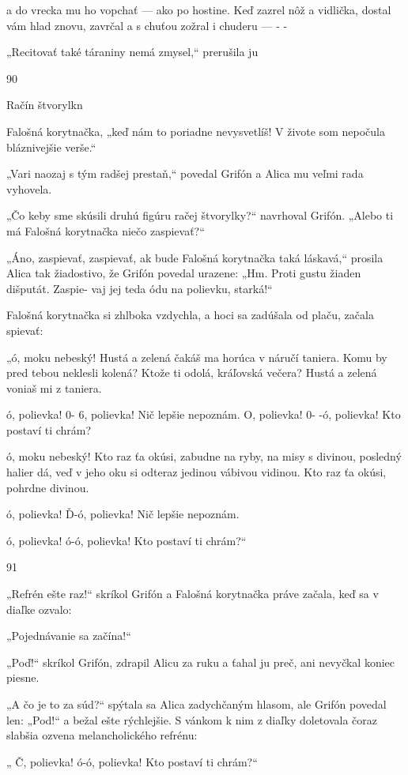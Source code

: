 \documentclass[12pt]{article}
\begin{document}
\begin{Parallel}[p]{}{}
{{a do vrecka mu ho vopchať — ako po hostine.
Keď zazrel nôž a vidlička, dostal vám hlad znovu,
zavrčal a s chuťou zožral i chuderu — - -

„Recitovať také táraniny nemá zmysel,“ prerušila ju

90

Račín štvorylkn

Falošná korytnačka, „keď nám to poriadne nevysvetlíš!
V živote som nepočula bláznivejšie verše.“

„Vari naozaj s tým radšej prestaň,“ povedal Grifón
a Alica mu veľmi rada vyhovela.

„Čo keby sme skúsili druhú figúru račej štvorylky?“
navrhoval Grifón. „Alebo ti má Falošná korytnačka niečo
zaspievať?“

„Áno, zaspievať, zaspievať, ak bude Falošná korytnačka
taká láskavá,“ prosila Alica tak žiadostivo, že Grifón
povedal urazene: „Hm. Proti gustu žiaden dišputát. Zaspie-
vaj jej teda ódu na polievku, starká!“

Falošná korytnačka si zhlboka vzdychla, a hoci sa
zadúšala od plaču, začala spievať:

„ó, moku nebeský! Hustá a zelená
čakáš ma horúca v náručí taniera.
Komu by pred tebou neklesli kolená?
Ktože ti odolá, kráľovská večera?
Hustá a zelená voniaš mi z taniera.

 

ó, polievka! 0- 6, polievka!
Nič lepšie nepoznám.
O, polievka! 0- -ó, polievka!
Kto postaví ti chrám?

ó, moku nebeský! Kto raz ťa okúsi,
zabudne na ryby, na misy s divinou,
posledný halier dá, veď v jeho oku si
odteraz jedinou vábivou vidinou.
Kto raz ťa okúsi, pohrdne divinou.

ó, polievka! Ď-ó, polievka!
Nič lepšie nepoznám.

ó, polievka! ó-ó, polievka!
Kto postaví ti chrám?“

91

„Refrén ešte raz!“ skríkol
Grifón a Falošná korytnačka práve
začala, keď sa v diaľke ozvalo:

„Pojednávanie sa začína!“

„Poď!“ skríkol Grifón, zdrapil
Alicu za ruku a ťahal ju preč, ani
nevyčkal koniec piesne.

„A čo je to za súd?“ spýtala sa
Alica zadychčaným hlasom, ale
Grifón povedal len: „Pod!“ a bežal
ešte rýchlejšie. S vánkom k nim
z diaľky doletovala čoraz slabšia
ozvena melancholického refrénu:

„ Č, polievka! ó-ó, polievka!
Kto postaví ti chrám?“

}}
\end{Parallel}
\end{document}

